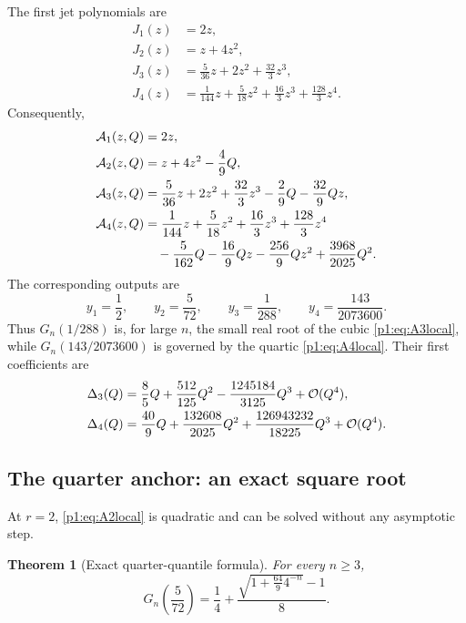 \documentclass[11pt,oneside]{article}
\numberwithin{equation}{section}
\newtheorem{theorem}{Theorem}[section]
\theoremstyle{definition}
\theoremstyle{remark}
\begin{document}
The first jet polynomials are
\begin{align}
 J_1(z)&=2z,\label{p1:eq:J1}\\
 J_2(z)&=z+4z^2,\label{p1:eq:J2}\\
 J_3(z)&=\frac5{36}z+2z^2+\frac{32}{3}z^3,\label{p1:eq:J3}\\
 J_4(z)&=\frac1{144}z+\frac5{18}z^2+\frac{16}{3}z^3+\frac{128}{3}z^4.
 \label{p1:eq:J4}
\end{align}
Consequently,
\begin{align}
 \mathcal A_1(z,Q)&=2z,\label{p1:eq:A1local}\\
 \mathcal A_2(z,Q)&=z+4z^2-\frac49Q,\label{p1:eq:A2local}\\
 \mathcal A_3(z,Q)&=\frac5{36}z+2z^2+\frac{32}{3}z^3
 -\frac29Q-\frac{32}{9}Qz,\label{p1:eq:A3local}\\
 \mathcal A_4(z,Q)&=\frac1{144}z+\frac5{18}z^2+\frac{16}{3}z^3+\frac{128}{3}z^4
 \notag\\
 &\quad-\frac5{162}Q-\frac{16}{9}Qz-\frac{256}{9}Qz^2
 +\frac{3968}{2025}Q^2.
 \label{p1:eq:A4local}
\end{align}
The corresponding outputs are
\begin{equation}
 y_1=\frac12,
 \qquad y_2=\frac5{72},
 \qquad y_3=\frac1{288},
 \qquad y_4=\frac{143}{2073600}.
 \label{p1:eq:y-first}
\end{equation}
Thus $G_n(1/288)$ is, for large $n$, the small real root of the cubic
\eqref{p1:eq:A3local}, while $G_n(143/2073600)$ is governed by the quartic
\eqref{p1:eq:A4local}.  Their first coefficients are
\begin{align}
 \Delta_3(Q)&=\frac85Q+\frac{512}{125}Q^2
 -\frac{1245184}{3125}Q^3+\mathcal O(Q^4),
 \label{p1:eq:Delta3}\\
 \Delta_4(Q)&=\frac{40}{9}Q+\frac{132608}{2025}Q^2
 +\frac{126943232}{18225}Q^3+\mathcal O(Q^4).
 \label{p1:eq:Delta4}
\end{align}

\subsection{The quarter anchor: an exact square root}

At $r=2$, \eqref{p1:eq:A2local} is quadratic and can be solved without any
asymptotic step.

\begin{theorem}[Exact quarter-quantile formula]
\label{p1:thm:quarter-exact}
For every $n\ge3$,
\begin{equation}
 \boxed{
 G_n\!\left(\frac5{72}\right)
 =\frac14+\frac{\sqrt{1+\frac{64}{9}4^{-n}}-1}{8}.}
 \label{p1:eq:quarter-exact}
\end{equation}
\end{theorem}
\end{document}
